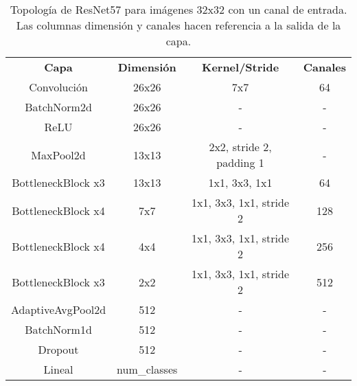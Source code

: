 \begin{table}[]
\begin{tabular}{|c|c|c|c|}
\hline
\multirow{2}{*}{\textbf{Capa}} & \multirow{2}{*}{\textbf{Dimensión}} & \multirow{2}{*}{\textbf{Kernel/Stride}} & \multirow{2}{*}{\textbf{Canales}} \\
                               &                                            &                                         &                                          \\ \hline
Convolución                    & 26x26                                      & 7x7                                     & 64                                       \\ \hline
BatchNorm2d                    & 26x26                                      & -                                       & -                                        \\ \hline
ReLU                           & 26x26                                      & -                                       & -                                        \\ \hline
MaxPool2d                      & 13x13                                      & 2x2, stride 2, padding 1                & -                                        \\ \hline
BottleneckBlock x3             & 13x13                                      & 1x1, 3x3, 1x1                           & 64                                       \\ \hline
BottleneckBlock x4             & 7x7                                        & 1x1, 3x3, 1x1, stride 2                 & 128                                      \\ \hline
BottleneckBlock x4             & 4x4                                        & 1x1, 3x3, 1x1, stride 2                 & 256                                      \\ \hline
BottleneckBlock x3             & 2x2                                        & 1x1, 3x3, 1x1, stride 2                 & 512                                      \\ \hline
AdaptiveAvgPool2d              & 512                                        & -                                       & -                                        \\ \hline
BatchNorm1d                    & 512                                        & -                                       & -                                        \\ \hline
Dropout                        & 512                                        & -                                       & -                                        \\ \hline
Lineal                         & num\_classes                               & -                                       & -                                        \\ \hline
\end{tabular}
\caption{Topología de ResNet57 para imágenes 32x32 con un canal de entrada. Las columnas dimensión y canales hacen referencia a la salida de la capa.}
\label{table:resnet57}
\end{table}
